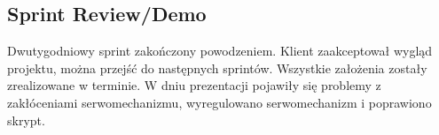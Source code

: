 
\subsection{Sprint Review/Demo}
	Dwutygodniowy sprint zakończony powodzeniem. Klient zaakceptował wygląd projektu, można przejść do następnych sprintów. Wszystkie założenia zostały zrealizowane w terminie. W dniu prezentacji pojawiły się problemy z zakłóceniami serwomechanizmu, wyregulowano serwomechanizm i poprawiono skrypt.
